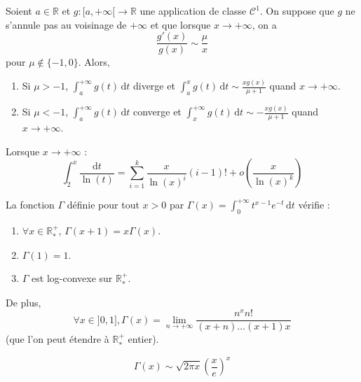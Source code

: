   \begin{application}
    Soient $a \in \mathbb{R}$ et $g : [a, +\infty[ \rightarrow \mathbb{R}$ une application de classe $\mathcal{C}^1$. On suppose que $g$ ne s'annule pas au voisinage de $+\infty$ et que lorsque $x \rightarrow +\infty$, on a
    \[ \frac{g'(x)}{g(x)} \sim \frac{\mu}{x} \]
    pour $\mu \notin \{ -1, 0 \}$. Alors,
    \begin{enumerate}[label={\bfseries(\roman*)}]
      \item Si $\mu > -1$, $\int_a^{+\infty} g(t) \, \mathrm{d}t$ diverge et $\int_a^x g(t) \, \mathrm{d}t \sim \frac{xg(x)}{\mu + 1}$ quand $x \rightarrow +\infty$.
      \item Si $\mu < -1$, $\int_a^{+\infty} g(t) \, \mathrm{d}t$ converge et $\int_x^{+\infty} g(t) \, \mathrm{d}t \sim -\frac{xg(x)}{\mu + 1}$ quand $x \rightarrow +\infty$.
    \end{enumerate}
  \end{application}


  \begin{example}
    Lorsque $x \rightarrow +\infty$ :
    \[ \int_{2}^{x} \frac{\mathrm{d}t}{\ln(t)} = \sum_{i=1}^k \frac{x}{\ln(x)^i} (i-1)! + o \left( \frac{x}{\ln(x)^k} \right) \]
  \end{example}


  \begin{proposition}
    La fonction $\Gamma$ définie pour tout $x > 0$ par $\Gamma(x) = \int_0^{+\infty} t^{x-1} e^{-t} \, \mathrm{d}t$ vérifie :
    \begin{enumerate}[label={\bfseries(\roman*)}]
      \item $\forall x \in \mathbb{R}^+_*$, $\Gamma(x+1) = x\Gamma(x)$.
      \item $\Gamma(1) = 1$.
      \item $\Gamma$ est log-convexe sur $\mathbb{R}^+_*$.
    \end{enumerate}
    De plus,
    \[ \forall x \in ]0, 1], \Gamma(x) = \lim_{n \rightarrow +\infty} \frac{n^x n!}{(x+n) \dots (x+1)x} \]
    (que l'on peut étendre à $\mathbb{R}^+_*$ entier).
  \end{proposition}


  \begin{theorem}
    \[ \Gamma(x) \sim \sqrt{2\pi x} \left( \frac{x}{e} \right)^x \]
  \end{theorem}

